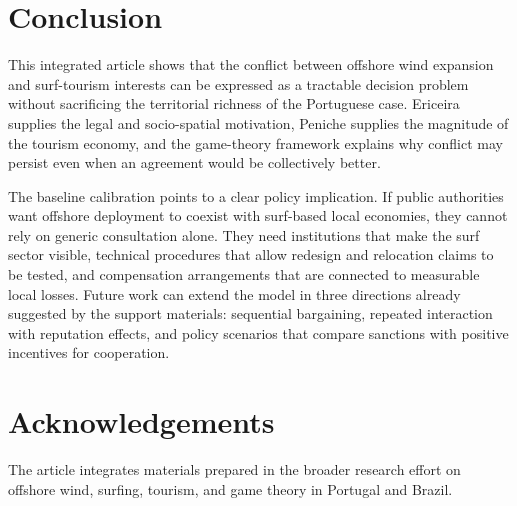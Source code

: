 \documentclass[final,times,authoryear]{elsarticle}
\begin{document}
\section{Conclusion}
\label{sec_conclusion}

This integrated article shows that the conflict between offshore wind expansion and surf-tourism interests can be expressed as a tractable decision problem without sacrificing the territorial richness of the Portuguese case. Ericeira supplies the legal and socio-spatial motivation, Peniche supplies the magnitude of the tourism economy, and the game-theory framework explains why conflict may persist even when an agreement would be collectively better.

The baseline calibration points to a clear policy implication. If public authorities want offshore deployment to coexist with surf-based local economies, they cannot rely on generic consultation alone. They need institutions that make the surf sector visible, technical procedures that allow redesign and relocation claims to be tested, and compensation arrangements that are connected to measurable local losses. Future work can extend the model in three directions already suggested by the support materials: sequential bargaining, repeated interaction with reputation effects, and policy scenarios that compare sanctions with positive incentives for cooperation.

\section*{Acknowledgements}

The article integrates materials prepared in the broader research effort on offshore wind, surfing, tourism, and game theory in Portugal and Brazil.





\end{document}
